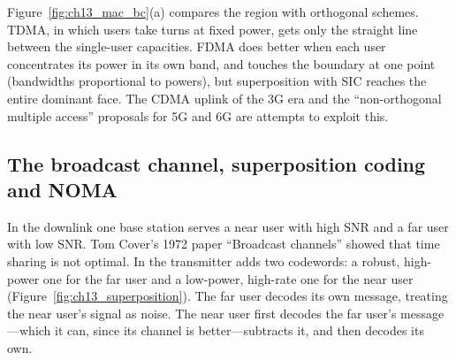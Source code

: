 
Figure~\ref{fig:ch13_mac_bc}(a) compares the region with orthogonal schemes. TDMA, in which users
take turns at fixed power, gets only the straight line between the single-user capacities.
FDMA does better when each user concentrates its power in its own band, and touches the boundary
at one point (bandwidths proportional to powers), but superposition with SIC reaches the entire
dominant face. The CDMA uplink of the 3G era and the ``non-orthogonal multiple access'' proposals
for 5G and 6G are attempts to exploit this.

\subsection{The broadcast channel, superposition coding and NOMA}

In the downlink one base station serves a near user with high SNR and a far user with low SNR. Tom
Cover's 1972 paper ``Broadcast channels'' showed that time sharing is not optimal. In
 the transmitter adds two codewords: a robust, high-power one for the far
user and a low-power, high-rate one for the near user (Figure~\ref{fig:ch13_superposition}). The far
user decodes its own message, treating the near user's signal as noise. The near user first decodes
the far user's message---which it can, since its channel is better---subtracts it, and then decodes
its own.


